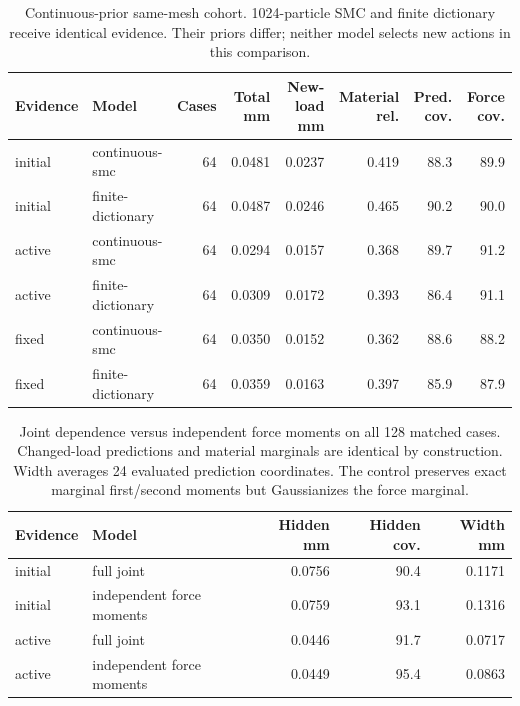 \begin{table}[!t]\centering\small\setlength{\tabcolsep}{4pt}
\caption{Continuous-prior same-mesh cohort. 1024-particle SMC and finite dictionary receive identical evidence. Their priors differ; neither model selects new actions in this comparison.}
\begin{tabular}{llrrrrrr}\toprule
Evidence & Model & Cases & Total mm & New-load mm & Material rel. & Pred. cov. & Force cov.\\\midrule
initial & continuous-smc & 64 & 0.0481 & 0.0237 & 0.419 & 88.3 & 89.9\\
initial & finite-dictionary & 64 & 0.0487 & 0.0246 & 0.465 & 90.2 & 90.0\\
active & continuous-smc & 64 & 0.0294 & 0.0157 & 0.368 & 89.7 & 91.2\\
active & finite-dictionary & 64 & 0.0309 & 0.0172 & 0.393 & 86.4 & 91.1\\
fixed & continuous-smc & 64 & 0.0350 & 0.0152 & 0.362 & 88.6 & 88.2\\
fixed & finite-dictionary & 64 & 0.0359 & 0.0163 & 0.397 & 85.9 & 87.9\\
\bottomrule\end{tabular}
\end{table}

\begin{table}[!t]\centering\small\setlength{\tabcolsep}{4pt}
\caption{Joint dependence versus independent force moments on all 128 matched cases. Changed-load predictions and material marginals are identical by construction. Width averages 24 evaluated prediction coordinates. The control preserves exact marginal first/second moments but Gaussianizes the force marginal.}
\begin{tabular}{llrrr}\toprule
Evidence & Model & Hidden mm & Hidden cov. & Width mm\\\midrule
initial & full joint & 0.0756 & 90.4 & 0.1171\\
initial & independent force moments & 0.0759 & 93.1 & 0.1316\\
active & full joint & 0.0446 & 91.7 & 0.0717\\
active & independent force moments & 0.0449 & 95.4 & 0.0863\\
\bottomrule\end{tabular}
\end{table}

